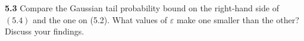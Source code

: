 








\noindent\textbf{5.3} Compare the Gaussian tail probability bound on the right-hand side of $(5.4)$ and the one on (5.2). What values of $\varepsilon$ make one smaller than the other? Discuss your findings.

